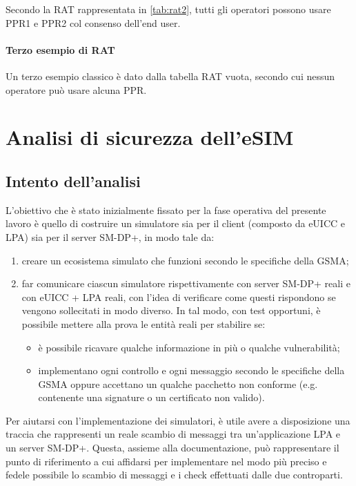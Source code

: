 \documentclass[10pt, oneside]{book}
\begin{document}
Secondo la RAT rappresentata in \ref{tab:rat2}, tutti gli operatori possono usare PPR1 e PPR2 col consenso dell'end user.

\subsubsection{Terzo esempio di RAT}
Un terzo esempio classico è dato dalla tabella RAT vuota, secondo cui nessun operatore può usare alcuna PPR.

\chapter{Analisi di sicurezza dell'eSIM}
\section{Intento dell'analisi}
L'obiettivo che è stato inizialmente fissato per la fase operativa del presente lavoro è quello di costruire un simulatore sia per il client (composto da eUICC e LPA) sia per il server SM-DP+, in modo tale da:
\begin{enumerate}
\item creare un ecosistema simulato che funzioni secondo le specifiche della GSMA;
\item far comunicare ciascun simulatore rispettivamente con server SM-DP+ reali e con eUICC + LPA reali, con l'idea di verificare come questi rispondono se vengono sollecitati in modo diverso. In tal modo, con test opportuni, è possibile mettere alla prova le entità reali per stabilire se:
\begin{itemize}[itemsep=0pt]
\item è possibile ricavare qualche informazione in più o qualche vulnerabilità;
\item implementano ogni controllo e ogni messaggio secondo le specifiche della GSMA oppure accettano un qualche pacchetto non conforme (e.g. contenente una signature o un certificato non valido).
\end{itemize}
\end{enumerate}
Per aiutarsi con l'implementazione dei simulatori, è utile avere a disposizione una traccia che rappresenti un reale scambio di messaggi tra un'applicazione LPA e un server SM-DP+. Questa, assieme alla documentazione, può rappresentare il punto di riferimento a cui affidarsi per implementare nel modo più preciso e fedele possibile lo scambio di messaggi e i check effettuati dalle due controparti.
\end{document}
